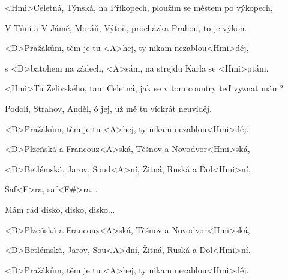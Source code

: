 

\zs
<Hmi>Celetná, Týnská, na Příkopech,
ploužím se městem po výkopech,

V Tůni a V Jámě, Moráň, Výtoň,
procházka Prahou, to je výkon.
\ks

\zr
<D>Pražákům, těm je tu <A>hej,
ty nikam nezablou<Hmi>děj,

s <D>batohem na zádech, <A>sám,
na strejdu Karla se <Hmi>ptám.
\kr

\zs
<Hmi>Tu Želivského, tam Celetná,
jak se v tom country teď vyznat mám?

Podolí, Strahov, Anděl, ó jej,
už mě tu víckrát neuviděj.
\ks

\zr
<D>Pražákům, těm je tu <A>hej,
ty nikam nezablou<Hmi>děj.

<D>Plzeňská a Francouz<A>ská,
Těšnov a Novodvor<Hmi>ská,

<D>Betlémská, Jarov, Soud<A>ní,
Žitná, Ruská a Dol<Hmi>ní,

Saf<F>ra, saf<F#>ra...

Mám rád disko, disko, disko...
\kr


\zr
<D>Plzeňská a Francouz<A>ská,
Těšnov a Novodvor<Hmi>ská,

<D>Betlémská, Jarov, Sou<A>dní,
Žitná, Ruská a Dol<Hmi>ní.
\kr

\zr
<D>Pražákům, těm je tu <A>hej,
ty nikam nezablou<Hmi>děj.
\kr
\kp
